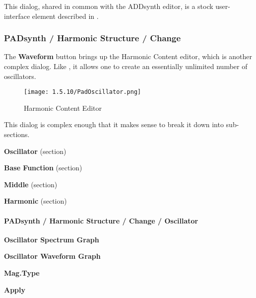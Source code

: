    This dialog, shared in common with the ADDsynth editor, is a stock
   user-interface element described in
   .

\subsubsection{PADsynth / Harmonic Structure / Change}
\label{subsubsec:padsynth_harmonic_structure_change}

   The \textbf{Waveform} button brings up the
   Harmonic Content editor, which is another complex dialog.
   Like ,
   it allows one to create an essentially unlimited number of oscillators.

\begin{figure}[H]
   \centering
   \texttt{[image: 1.5.10/PadOscillator.png]}
   \caption{Harmonic Content Editor}
   \label{fig:padsynth_harmonic_content_editor}
\end{figure}

   This dialog is complex enough that it makes sense to break it down into
   sub-sections.

   \begin{enumber}
      \item \textbf{Oscillator} (section)
      \item \textbf{Base Function} (section)
      \item \textbf{Middle} (section)
      \item \textbf{Harmonic} (section)
   \end{enumber}

\paragraph{PADsynth / Harmonic Structure / Change / Oscillator}
\label{paragraph:padsynth_harmonic_structure_change_oscillator}

   \begin{enumber}
      \item \textbf{Oscillator Spectrum Graph}
      \item \textbf{Oscillator Waveform Graph}
      \item \textbf{Mag.Type}
      \item \textbf{Apply}
   \end{enumber}

   \setcounter{ItemCounter}{0}      %

